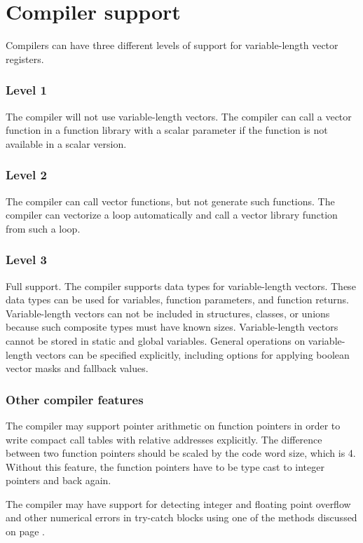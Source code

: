 \documentclass[forwardcom.tex]{subfiles}
\begin{document}
\section{Compiler support} \label{compilerSupport}
Compilers can have three different levels of support for variable-length vector registers. 

\subsubsection{Level 1}
The compiler will not use variable-length vectors. The compiler can call a vector function in a function library with a scalar parameter if the function is not available in a scalar version. 

\subsubsection{Level 2}
The compiler can call vector functions, but not generate such functions. The compiler can vectorize a loop automatically and call a vector library function from such a loop. 

\subsubsection{Level 3}
Full support. The compiler supports data types for variable-length vectors. These data types can be used for variables, function parameters, and function returns. Variable-length vectors can not be included in structures, classes, or unions because such composite types must have known sizes. 
Variable-length vectors cannot be stored in static and global variables.
General operations on variable-length vectors can be specified explicitly, including options for applying boolean vector masks and fallback values.

\subsubsection{Other compiler features}
The compiler may support pointer arithmetic on function pointers in order to write compact call tables with relative addresses explicitly. The difference between two function pointers should be scaled by the code word size, which is 4. Without this feature, the function pointers have to be type cast to integer pointers and back again. 

\vspace{2mm}
The compiler may have support for detecting integer and floating point overflow and other numerical errors in try-catch blocks using one of the methods discussed on page \pageref{integerOverflowDetection}.
\end{document}
